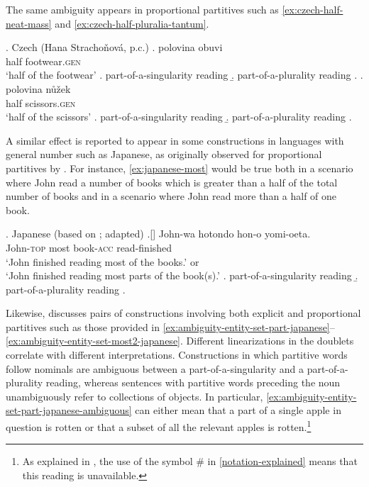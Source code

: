 The same ambiguity appears in proportional partitives such as \ref{ex:czech-half-neat-mass} and \ref{ex:czech-half-pluralia-tantum}.\largerpage[-1]

\ex.\label{ex:czech-half} Czech (Hana Strachoňová, p.c.)
\ag. polovina obuvi\label{ex:czech-half-neat-mass}\\
half footwear\textsc{.gen}\\
`half of the footwear'
\a. part-of-a-singularity reading
\b. part-of-a-plurality reading
\z.
\bg. polovina nůžek\label{ex:czech-half-pluralia-tantum}\\
half scissors\textsc{.gen}\\
`half of the scissors'
\a. part-of-a-singularity reading
\b. part-of-a-plurality reading
\z.

A similar effect is reported to appear in some constructions in languages with general number such as Japanese, as originally observed for proportional partitives by \citet{sauerland_yatsushiro2004silent}. For instance, \ref{ex:japanese-most} would be true both in a scenario where John read a number of books which is greater than a half of the total number of books and in a scenario where John read more than a half of one book. 

\ex. Japanese (based on \citealt{sauerland_yatsushiro2004silent}; adapted)
\bg.[] John-wa hotondo hon-o yomi-oeta.\label{ex:japanese-most}\\
John-\textsc{top} most book-\textsc{acc} read-finished\\
`John finished reading most of the books.' or\\
`John finished reading most parts of the book(s).'
\a. part-of-a-singularity reading
\b. part-of-a-plurality reading
\z.

Likewise, \citet{watanabe2013count,watanabe2017mass} discusses pairs of constructions involving both explicit and proportional partitives such as those provided in \ref{ex:ambiguity-entity-set-part-japanese}--\ref{ex:ambiguity-entity-set-most2-japanese}. Different linearizations in the doublets correlate with different interpretations. Constructions in which partitive words follow nominals are ambiguous between a part-of-a-singularity and a part-of-a-plurality reading, whereas sentences with partitive words preceding the noun unambiguously refer to collections of objects. In particular, \ref{ex:ambiguity-entity-set-part-japanese-ambiguous} can either mean that a part of a single apple in question is rotten or that a subset of all the relevant apples is rotten.\footnote{As explained in , the use of the symbol \# in \ref{notation-explained} means that this reading is unavailable.}\largerpage[-1]

